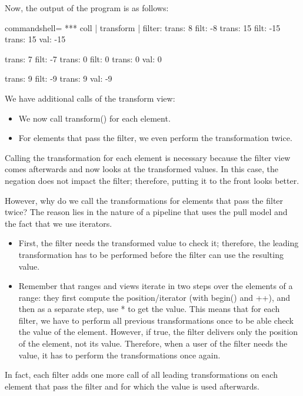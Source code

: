 Now, the output of the program is as follows:

{\footnotesize
\begin{tcblisting}{commandshell={}}
*** coll | transform | filter:
trans: 8
filt: -8
trans: 15
filt: -15
trans: 15
val: -15

trans: 7
filt: -7
trans: 0
filt: 0
trans: 0
val: 0

trans: 9
filt: -9
trans: 9
val: -9
\end{tcblisting}
}

We have additional calls of the transform view:

\begin{itemize}
\item
We now call transform() for each element.

\item
For elements that pass the filter, we even perform the transformation twice.
\end{itemize}

Calling the transformation for each element is necessary because the filter view comes afterwards and now looks at the transformed values. In this case, the negation does not impact the filter; therefore, putting it to the front looks better.

However, why do we call the transformations for elements that pass the filter twice? The reason lies in the nature of a pipeline that uses the pull model and the fact that we use iterators.

\begin{itemize}
\item
First, the filter needs the transformed value to check it; therefore, the leading transformation has to be performed before the filter can use the resulting value.
	
\item
Remember that ranges and views iterate in two steps over the elements of a range: they first compute the position/iterator (with begin() and ++), and then as a separate step, use * to get the value. This means that for each filter, we have to perform all previous transformations once to be able check the value of the element. However, if true, the filter delivers only the position of the element, not its value. Therefore, when a user of the filter needs the value, it has to perform the transformations once again.
\end{itemize}

In fact, each filter adds one more call of all leading transformations on each element that pass the filter and for which the value is used afterwards.

